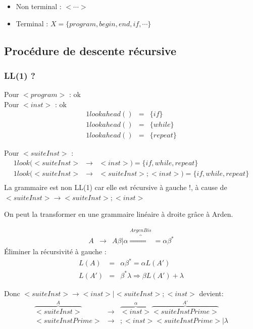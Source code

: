 \documentclass[12pt,a4paper,openany]{book}
\begin{document}
\begin{remarque}
	\begin{itemize}
		\item Non terminal : $< \cdots >$
		\item Terminal : $X = \{program, begin, end, if, \cdots\}$
	\end{itemize}
\end{remarque}

\subsection{Procédure de descente récursive}
\subsubsection{LL(1) ?}
Pour $<program>$ : ok\\
Pour $<inst>$  : ok 
\begin{eqnarray*}
	1lookahead() &=& \{if\}\\
	1lookahead() &=& \{while\}\\
	1lookahead() &=& \{repeat\}
\end{eqnarray*}

Pour $<suiteInst>$ : 
\begin{eqnarray*}
	1look(<suiteInst> &\rightarrow& <inst>) = \{if, while, repeat\}\\
	1look(<suiteInst> &\rightarrow& <suiteInst> ; <inst>) = \{if, while, repeat\}\\
\end{eqnarray*}
La grammaire est non LL(1) car elle est récursive à gauche !, à cause de $<suiteInst> \rightarrow <suiteInst> ; <inst>$

On peut la transformer en une grammaire linéaire à droite grâce à Arden.

\begin{eqnarray*}
	A &\rightarrow& A\beta|\alpha \overbrace{\Longrightarrow}^{ArgenBis} = \alpha\beta^*
\end{eqnarray*}
Éliminer la récursivité à gauche : 
\begin{eqnarray*}
	L(A) &=&  \alpha\beta^* = \alpha L(A')\\
	L(A') &=& \beta^* \lambda \Longrightarrow \beta L(A') + \lambda
\end{eqnarray*}

Donc $<suiteInst> \rightarrow <inst> | <suiteInst> ; <inst>$ devient:
\begin{eqnarray*}
\overbrace{<suiteInst>}^A &\rightarrow& \overbrace{<inst>}^{\alpha}\overbrace{<suiteInstPrime>}^{A'}\\
<suiteInstPrime> &\rightarrow& ; <inst><suiteInstPrime>|\lambda
\end{eqnarray*}
\end{document}
